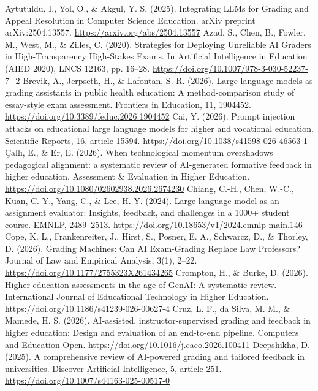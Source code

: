  Aytutuldu, I., Yol, O., \& Akgul, Y. S. (2025). Integrating LLMs for Grading and Appeal Resolution in Computer Science Education. arXiv preprint arXiv:2504.13557. \url{https://arxiv.org/abs/2504.13557}
 Azad, S., Chen, B., Fowler, M., West, M., \& Zilles, C. (2020). Strategies for Deploying Unreliable AI Graders in High-Transparency High-Stakes Exams. In Artificial Intelligence in Education (AIED 2020), LNCS 12163, pp. 16--28. \url{https://doi.org/10.1007/978-3-030-52237-7_2}
 Brevik, A., Jerpseth, H., \& Lafontan, S. R. (2026). Large language models as grading assistants in public health education: A method-comparison study of essay-style exam assessment. Frontiers in Education, 11, 1904452. \url{https://doi.org/10.3389/feduc.2026.1904452}
 Cai, Y. (2026). Prompt injection attacks on educational large language models for higher and vocational education. Scientific Reports, 16, article 15594. \url{https://doi.org/10.1038/s41598-026-46563-1}
 \c{C}all\i{}, E., \& Er, E. (2026). When technological momentum overshadows pedagogical alignment: a systematic review of AI-generated formative feedback in higher education. Assessment \& Evaluation in Higher Education. \url{https://doi.org/10.1080/02602938.2026.2674230}
 Chiang, C.-H., Chen, W.-C., Kuan, C.-Y., Yang, C., \& Lee, H.-Y. (2024). Large language model as an assignment evaluator: Insights, feedback, and challenges in a 1000+ student course. EMNLP, 2489--2513. \url{https://doi.org/10.18653/v1/2024.emnlp-main.146}
 Cope, K. L., Frankenreiter, J., Hirst, S., Posner, E. A., Schwarcz, D., \& Thorley, D. (2026). Grading Machines: Can AI Exam-Grading Replace Law Professors? Journal of Law and Empirical Analysis, 3(1), 2--22. \url{https://doi.org/10.1177/2755323X261434265}
 Crompton, H., \& Burke, D. (2026). Higher education assessments in the age of GenAI: A systematic review. International Journal of Educational Technology in Higher Education. \url{https://doi.org/10.1186/s41239-026-00627-4}
 Cruz, L. F., da Silva, M. M., \& Mamede, H. S. (2026). AI-assisted, instructor-supervised grading and feedback in higher education: Design and evaluation of an end-to-end pipeline. Computers and Education Open. \url{https://doi.org/10.1016/j.caeo.2026.100411}
 Deepshikha, D. (2025). A comprehensive review of AI-powered grading and tailored feedback in universities. Discover Artificial Intelligence, 5, article 251. \url{https://doi.org/10.1007/s44163-025-00517-0}
